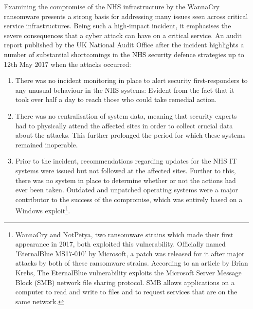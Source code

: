 Examining the compromise of the NHS infrastructure by the WannaCry ransomware presents a strong basis for addressing many issues seen across critical service infrastructures. Being such a high-impact incident, it emphasises the severe consequences that a cyber attack can have on a critical service. An audit report published by the UK National Audit Office after the incident \cite{AmyasMorseWannacry} highlights a number of substantial shortcomings in the NHS security defence strategies up to 12th May 2017 when the attacks occurred:
	
	\begin{enumerate}
		
		\item There was no incident monitoring in place to alert security first-responders to any unusual behaviour in the NHS systems: Evident from the fact that it took over half a day to reach those who could take remedial action. 
		
		\item There was no centralisation of system data, meaning that security experts had to physically attend the affected sites in order to collect crucial data about the attacks. This further prolonged the period for which these systems remained inoperable. 
	
		\item Prior to the incident, recommendations regarding  updates for the NHS IT systems were issued but not followed at the affected sites. Further to this, there was no system in place to determine whether or not the actions had ever been taken. Outdated and unpatched operating systems were a major contributor to the success of the compromise, which was entirely based on a Windows exploit\footnote{WannaCry and NotPetya, two ransomware strains which made their first appearance in 2017, both exploited this vulnerability. Officially named 'EternalBlue MS17-010' by Microsoft, a patch was released for it after major attacks by both of these ransomware strains. According to an article by Brian Krebs, \cite{KrebsWannaCry} The EternalBlue vulnerability exploits the Microsoft Server Message Block (SMB) network file sharing protocol. SMB allows applications on a computer to read and write to files and to request services that are on the same network.}.	
	\end{enumerate}
	
    

